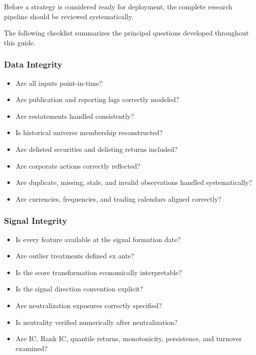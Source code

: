 \documentclass[11pt,a4paper]{article}
\begin{document}
Before a strategy is considered ready for deployment, the complete research
pipeline should be reviewed systematically.

The following checklist summarizes the principal questions developed throughout
this guide.


\subsubsection{Data Integrity}

\begin{itemize}
    \item[$\square$] Are all inputs point-in-time?
    \item[$\square$] Are publication and reporting lags correctly modeled?
    \item[$\square$] Are restatements handled consistently?
    \item[$\square$] Is historical universe membership reconstructed?
    \item[$\square$] Are delisted securities and delisting returns included?
    \item[$\square$] Are corporate actions correctly reflected?
    \item[$\square$] Are duplicate, missing, stale, and invalid observations
    handled systematically?
    \item[$\square$] Are currencies, frequencies, and trading calendars aligned
    correctly?
\end{itemize}


\subsubsection{Signal Integrity}

\begin{itemize}
    \item[$\square$] Is every feature available at the signal formation date?
    \item[$\square$] Are outlier treatments defined ex ante?
    \item[$\square$] Is the score transformation economically interpretable?
    \item[$\square$] Is the signal direction convention explicit?
    \item[$\square$] Are neutralization exposures correctly specified?
    \item[$\square$] Is neutrality verified numerically after neutralization?
    \item[$\square$] Are IC, Rank IC, quantile returns, monotonicity, persistence,
    and turnover examined?
\end{itemize}
\end{document}
